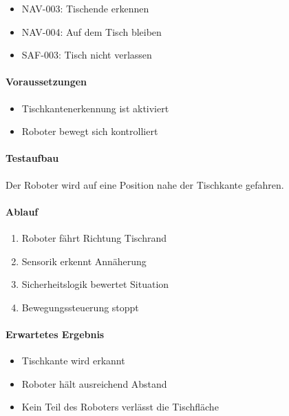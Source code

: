 \documentclass[
  a4paper,
  12pt,
  DIV=12,        %
  parskip=half,  %
  headings=small %
]{scrartcl}
\theoremstyle{definition}
\providecommand{\tightlist}{%
  \setlength{\itemsep}{0pt}\setlength{\parskip}{0pt}}
\theoremstyle{definition}
\begin{document}
\begin{itemize}
\tightlist
\item
  NAV-003: Tischende erkennen
\item
  NAV-004: Auf dem Tisch bleiben
\item
  SAF-003: Tisch nicht verlassen
\end{itemize}

\paragraph{Voraussetzungen}\label{voraussetzungen-26}

\begin{itemize}
\tightlist
\item
  Tischkantenerkennung ist aktiviert
\item
  Roboter bewegt sich kontrolliert
\end{itemize}

\paragraph{Testaufbau}\label{testaufbau-3}

Der Roboter wird auf eine Position nahe der Tischkante gefahren.

\paragraph{Ablauf}\label{ablauf-27}

\begin{enumerate}
\def\labelenumi{\arabic{enumi}.}
\tightlist
\item
  Roboter fährt Richtung Tischrand
\item
  Sensorik erkennt Annäherung
\item
  Sicherheitslogik bewertet Situation
\item
  Bewegungssteuerung stoppt
\end{enumerate}

\paragraph{Erwartetes Ergebnis}\label{erwartetes-ergebnis-27}

\begin{itemize}
\tightlist
\item
  Tischkante wird erkannt
\item
  Roboter hält ausreichend Abstand
\item
  Kein Teil des Roboters verlässt die Tischfläche
\end{itemize}
\end{document}

